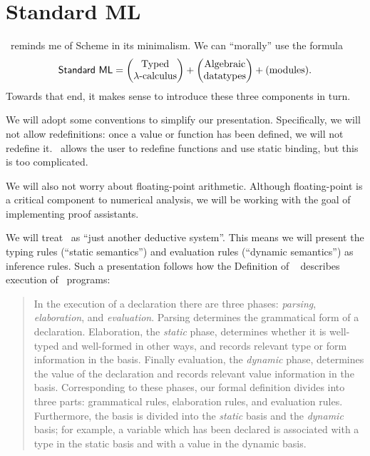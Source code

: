 \chapter{Standard ML}\label{chapter:sml}

\begin{node}\label{sml-0000}%
\SML\ reminds me of Scheme in its minimalism. We can ``morally'' use the
formula
\begin{equation*}
\mbox{\textsf{Standard ML}}=\begin{pmatrix}
\mbox{Typed}\\
\lambda\mbox{-calculus}
\end{pmatrix} + \begin{pmatrix}\mbox{Algebraic}\\
\mbox{datatypes}
\end{pmatrix} + (\mbox{modules}).
\end{equation*}
Towards that end, it makes sense to introduce these three components in turn.
\end{node}%

\begin{node}[Conventions]\label{sml-0001}%
We will adopt some conventions to simplify our
presentation. Specifically, we will not allow redefinitions: once a
value or function has been defined, we will not redefine
it. \SML\ allows the user to redefine functions and use static binding,
but this is too complicated.

We will also not worry about floating-point arithmetic. Although
floating-point is a critical component to numerical analysis, we will be
working with the goal of implementing proof assistants.
\end{node}

\begin{node}\label{sml-0002}%
We will treat \SML\ as ``just another deductive system''. This means we
will present the typing rules (``static semantics'') and evaluation
rules (``dynamic semantics'') as inference rules. Such a presentation
follows how the Definition of \SML~\cite[\S1]{milner1997definition}
describes execution of \SML\ programs:
\begin{quote}
In the execution of a declaration there are three phases:
\emph{parsing}, \emph{elaboration}, and \emph{evaluation}. Parsing
determines the grammatical form of a declaration. Elaboration, the
\emph{static} phase, determines whether it is well-typed and well-formed
in other ways, and records relevant type or form information in the
basis. Finally evaluation, the \emph{dynamic} phase, determines the
value of the declaration and records relevant value information in the
basis. Corresponding to these phases, our formal definition divides into
three parts: grammatical rules, elaboration rules, and evaluation
rules. Furthermore, the basis is divided into the \emph{static} basis
and the \emph{dynamic} basis; for example, a variable which has been
declared is associated with a type in the static basis and with a value
in the dynamic basis.
\end{quote}
\end{node}

